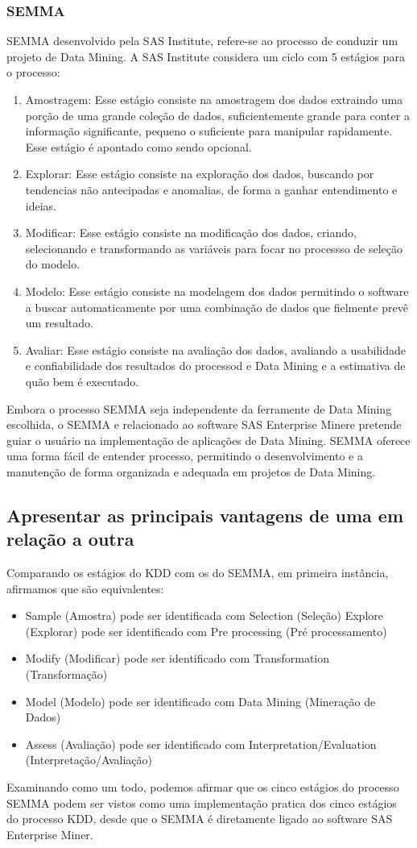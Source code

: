 \documentclass{article}
\begin{document}
\subsubsection{SEMMA}
SEMMA desenvolvido pela SAS Institute, refere-se ao processo de conduzir um projeto de Data Mining. A SAS Institute considera um ciclo com 5 estágios para o processo:
\begin{enumerate}
    \item Amostragem: Esse estágio consiste na amostragem dos dados extraindo uma porção de uma grande coleção de dados, suficientemente grande para conter a informação significante, pequeno o suficiente para manipular rapidamente. Esse estágio é apontado como sendo opcional.
    \item Explorar: Esse estágio consiste na exploração dos dados, buscando por tendencias não antecipadas e anomalias, de forma a ganhar entendimento e ideias.
    \item Modificar: Esse estágio consiste na modificação dos dados, criando, selecionando e transformando as variáveis para focar no processso de seleção do modelo.
    \item Modelo: Esse estágio consiste na modelagem dos dados permitindo o software a buscar automaticamente por uma combinação de dados que fielmente prevê um resultado.
    \item Avaliar: Esse estágio consiste na avaliação dos dados, avaliando a usabilidade e confiabilidade dos resultados do processod e Data Mining e a estimativa de quão bem é executado.
\end{enumerate}
\noindent
Embora o processo SEMMA seja independente da ferramente de Data Mining escolhida, o SEMMA e relacionado ao software SAS Enterprise Minere pretende guiar o usuário na implementação de aplicações de Data Mining. SEMMA oferece uma forma fácil de entender processo, permitindo o desenvolvimento e a manutenção de forma organizada e adequada em projetos de Data Mining.
\newpage
\subsection{Apresentar as principais vantagens de uma em relação a outra}
Comparando os estágios do KDD com os do SEMMA, em primeira instância, afirmamos que são equivalentes:
\begin{itemize}
    \item Sample (Amostra) pode ser identificada com Selection (Seleção)
    Explore (Explorar) pode ser identificado com Pre processing (Pré processamento)
    \item Modify (Modificar) pode ser identificado com Transformation (Transformação)
    \item Model (Modelo) pode ser identificado com Data Mining (Mineração de Dados)
    \item Assess (Avaliação) pode ser identificado com Interpretation/Evaluation (Interpretação/Avaliação)
\end{itemize}
\noindent
Examinando como um todo, podemos afirmar que os cinco estágios do processo SEMMA podem ser vistos como uma implementação pratica dos cinco estágios do processo KDD, desde que o SEMMA é diretamente ligado ao software SAS Enterprise Miner.
\end{document}
